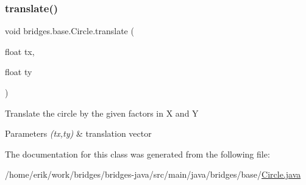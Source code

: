 \subsubsection{\texorpdfstring{translate()}{translate()}}
{\footnotesize\ttfamily void bridges.\+base.\+Circle.\+translate (\begin{DoxyParamCaption}\item[{float}]{tx,  }\item[{float}]{ty }\end{DoxyParamCaption})}

Translate the circle by the given factors in X and Y


\begin{DoxyParams}{Parameters}
{\em (tx,ty)} & translation vector \\
\hline
\end{DoxyParams}


The documentation for this class was generated from the following file\+:\begin{DoxyCompactItemize}
\item 
/home/erik/work/bridges/bridges-\/java/src/main/java/bridges/base/\hyperlink{_circle_8java}{Circle.\+java}\end{DoxyCompactItemize}
